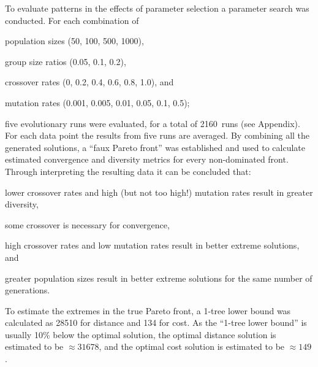 \documentclass[paper=a4, fontsize=10pt]{scrartcl}
\begin{document}
To evaluate patterns in the effects of parameter selection a parameter search was conducted. For each combination of
\begin{enumerate*}[label=\alph*)]
\item population sizes (50, 100, 500, 1000),
\item group size ratios (0.05, 0.1, 0.2),
\item crossover rates (0, 0.2, 0.4, 0.6, 0.8, 1.0), and
\item mutation rates (0.001, 0.005, 0.01, 0.05, 0.1, 0.5);
\end{enumerate*}
five evolutionary runs were evaluated, for a total of 2160~runs (see Appendix). For each data point the results from five runs are averaged. By combining all the generated solutions, a ``faux Pareto front'' was established and used to calculate estimated convergence and diversity metrics for every non-dominated front. Through interpreting the resulting data it can be concluded that:
\begin{enumerate*}[label=\arabic*)]
\item lower crossover rates and high (but not too high!) mutation rates result in greater diversity,
\item some crossover is necessary for convergence,
\item high crossover rates and low mutation rates result in better extreme solutions, and
\item greater population sizes result in better extreme solutions for the same number of generations.
\end{enumerate*}

To estimate the extremes in the true Pareto front, a 1-tree lower bound \cite{tsplowerbounds} was calculated as 28510 for distance and 134 for cost. As the ``1-tree lower bound'' is usually 10\% below the optimal solution, the optimal distance solution is estimated to be $\approx 31678$, and the optimal cost solution is estimated to be $\approx 149$.

\end{document}
